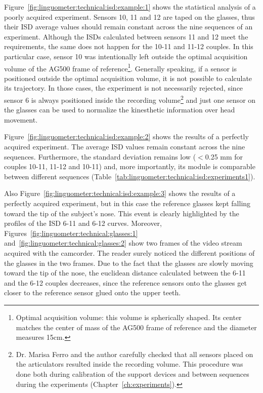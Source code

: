 
Figure~\ref{fig:linguometer:technical:isd:example:1} shows the statistical
analysis of a poorly acquired experiment.
Sensors 10, 11 and 12 are taped on the glasses, thus their ISD average values 
should remain constant across the nine sequences of an experiment.
Although the ISDs calculated between sensors 11 and 12 meet the requirements,
the same does not happen for the 10-11 and 11-12 couples.
In this particular case, sensor 10 was intentionally left outside the optimal 
acquisition volume of the AG500 frame of
reference\footnote{Optimal acquisition volume: this volume
is spherically shaped. Its center matches the center of mass of the
AG500 frame of reference and the diameter measures 15cm.}.
Generally speaking, if a sensor is positioned outside the optimal acquisition
volume, it is not possible to calculate its trajectory.
In those cases, the experiment is not necessarily rejected, since sensor 6 is
always positioned inside the recording 
volume\footnote{Dr. Marisa Ferro and the author carefully checked that all
sensors placed on the articulators resulted inside the recording volume.
This procedure was done both during calibration of the support devices and
between sequences during the experiments (Chapter~\ref{ch:experiments}).} 
and just one sensor on the glasses can be used to normalize the kinesthetic 
information over head movement.


Figure~\ref{fig:linguometer:technical:isd:example:2} shows the results of a
perfectly acquired experiment.
The average ISD values remain constant across the nine sequences. Furthermore,
the standard deviation remains low ($<$0.25 mm for couples 10-11, 11-12 and 
10-11) and, more importantly, its module is comparable between different 
sequences (Table~\ref{tab:linguometer:technical:isd:experiments1}).

Also Figure~\ref{fig:linguometer:technical:isd:example:3} shows the 
results of a perfectly acquired experiment, but in this case the reference
glasses kept falling toward the tip of the subject's nose.
This event is clearly highlighted by the profiles of the ISD 6-11 and 6-12
curves.
Moreover, Figures~\ref{fig:linguometer:technical:glasses:1}
and~\ref{fig:linguometer:technical:glasses:2} show two frames of the video
stream acquired with the camcorder. 
The reader surely noticed the different positions of the glasses in the two
frames. Due to the fact that the glasses are slowly moving toward the tip of 
the nose, the euclidean distance calculated between the 6-11 and
the 6-12 couples decreases, since the reference sensors onto the glasses get 
closer to the reference sensor glued onto the upper teeth.\\

